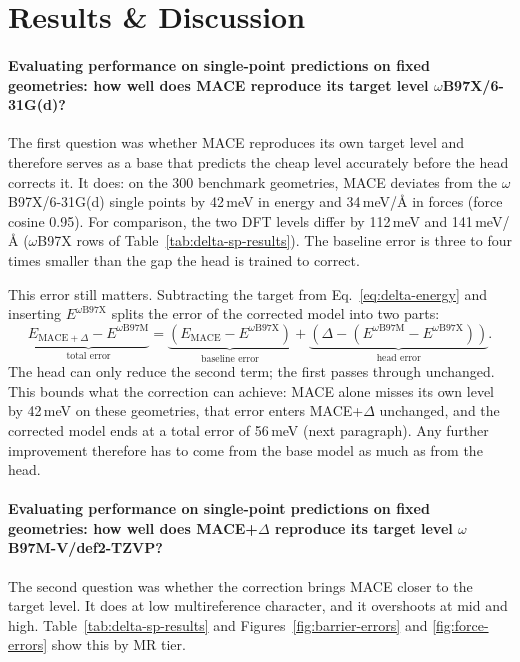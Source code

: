 \section{Results \& Discussion}
\label{sec:delta-results}

\paragraph{Evaluating performance on single-point predictions on fixed geometries: how well does MACE reproduce its target level $\omega$B97X/6-31G(d)?}
The first question was whether MACE reproduces its own target level
and therefore serves as a base that predicts the cheap level
accurately before the head corrects it. It does: on the 300 benchmark
geometries, MACE deviates from the $\omega$B97X/6-31G(d)
single points by 42\,meV in energy and 34\,meV/\AA{} in forces (force
cosine 0.95). For comparison, the two DFT levels differ by 112\,meV and
141\,meV/\AA{} ($\omega$B97X rows of Table~\ref{tab:delta-sp-results}). The
baseline error is three to four times smaller than the gap the head is
trained to correct.

This error still matters. Subtracting the target from Eq.~\eqref{eq:delta-energy} and
inserting $E^{\omega\text{B97X}}$ splits the error of the corrected model into
two parts:
\begin{equation}
\underbrace{E_{\text{MACE}+\Delta} - E^{\omega\text{B97M}}}_{\text{total error}}
=
\underbrace{\left(E_{\text{MACE}} - E^{\omega\text{B97X}}\right)}_{\text{baseline error}}
+
\underbrace{\left(\Delta - \left(E^{\omega\text{B97M}} - E^{\omega\text{B97X}}\right)\right)}_{\text{head error}} .
\label{eq:error-split}
\end{equation}
The head can only reduce the second term; the first passes through
unchanged. This bounds what the correction can achieve: MACE alone
misses its own level by 42\,meV on these geometries, that error
enters MACE+$\Delta$ unchanged, and the corrected model ends at a
total error of 56\,meV (next paragraph). Any further improvement
therefore has to come from the base model as much as from the head.


\paragraph{Evaluating performance on single-point predictions on fixed geometries: how well does MACE+$\Delta$ reproduce its target level $\omega$B97M-V/def2-TZVP?}
The second question was whether the correction brings MACE closer to the
target level. It does at low multireference character, and it
overshoots at mid and high. Table~\ref{tab:delta-sp-results} and
Figures~\ref{fig:barrier-errors} and \ref{fig:force-errors} show this by MR
tier.

